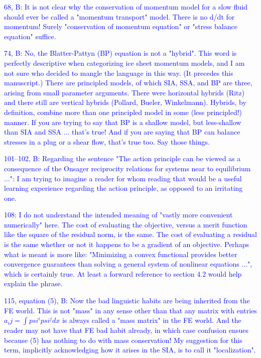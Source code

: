 \documentclass{article}
\theoremstyle{definition}
\theoremstyle{plain}
\begin{document}
\textcolor{blue}{68, B:  It is not clear why the conservation of momentum model for a slow fluid should ever be called a "momentum transport" model.  There is no d/dt for momentum!  Surely "conservation of momentum equation" or "stress balance equation" suffice.}

\textcolor{blue}{74, B:  No, the Blatter-Pattyn (BP) equation is not a "hybrid".  This word is perfectly descriptive when categorizing ice sheet momentum models, and I am not sure who decided to mangle the language in this way.  (It precedes this manuscript.)  There are principled models, of which SIA, SSA, and BP are three, arising from small parameter arguments.  There were horizontal hybrids (Ritz) and there still are vertical hybrids (Pollard, Bueler, Winkelmann).  Hybrids, by definition, combine more than one principled model in some (less principled!) manner.  If you are trying to say that BP is a shallow model, but less-shallow than SIA and SSA ... that's true!  And if you are saying that BP can balance stresses in a plug or a shear flow, that's true too.  Say those things.}

\textcolor{blue}{101--102, B:  Regarding the sentence "The action principle can be viewed as a consequence of the Onsager reciprocity relations for systems near to equilibrium ...":  I am trying to imagine a reader for whom reading that would be a useful learning experience regarding the action principle, as opposed to an irritating one.}

\textcolor{blue}{108:  I do not understand the intended meaning of "vastly more convenient numerically" here.  The cost of evaluating the objective, versus a merit function like the square of the residual norm, is the same.  The cost of evaluating a residual is the same whether or not it happens to be a gradient of an objective.  Perhaps what is meant is more like: "Minimizing a convex functional provides better convergence guarantees than solving a general system of nonlinear equations ...", which is certainly true.  At least a forward reference to section 4.2 would help explain the phrase.}

\textcolor{blue}{115, equation (5), B:  Now the bad linguistic habits are being inherited from the FE world.  This is not "mass" in any sense other than that any matrix with entries $a_ij = \int psi^i psi^j dx$ is always called a "mass matrix" in the FE world.  And the reader may not have that FE bad habit already, in which case confusion ensues because (5) has nothing to do with mass conservation!  My suggestion for this term, implicitly acknowledging how it arises in the SIA, is to call it "localization".}
\end{document}
